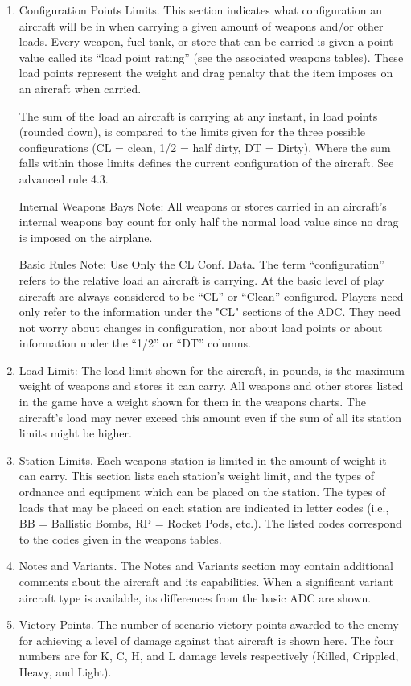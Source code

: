 \begin{enumerate}[resume]
    \item Configuration Points Limits. This section indicates what configuration an aircraft will be in when carrying a given amount of weapons and/or other loads. Every weapon, fuel tank, or store that can be carried is given a point value called its “load point rating” (see the associated weapons tables). These load points represent the weight and drag penalty that the item imposes on an aircraft when carried.

    The sum of the load an aircraft is carrying at any instant, in load points (rounded down), is compared to the limits given for the three possible configurations (CL = clean, 1/2 = half dirty, DT = Dirty). Where the sum falls within those limits defines the current configuration of the aircraft. See advanced rule 4.3.

    Internal Weapons Bays Note:  All weapons or stores carried in an aircraft's internal weapons bay count for only half the normal load value since no drag is imposed on the airplane.

    Basic Rules Note:  Use Only the CL Conf. Data. The term “configuration” refers to the relative load an aircraft is carrying. At the basic level of play aircraft are always considered to be “CL” or “Clean” configured. Players need only refer to the information under the "CL" sections of the ADC. They need not worry about changes in configuration, nor about load points or about information under the “1/2” or “DT” columns.

    \item Load Limit: The load limit shown for the aircraft, in pounds, is the maximum weight of weapons and stores it can carry. All weapons and other stores listed in the game have a weight shown for them in the weapons charts. The aircraft's load may never exceed this amount even if the sum of all its station limits might be higher.

    \item Station Limits. Each weapons station is limited in the amount of weight it can carry. This section lists each station's weight limit, and the types of ordnance and equipment which can be placed on the station. The types of loads that may be placed on each station are indicated in letter codes (i.e., BB = Ballistic Bombs, RP = Rocket Pods, etc.). The listed codes correspond to the codes given in the weapons tables.

    \item Notes and Variants. The Notes and Variants section may contain additional comments about the aircraft and its capabilities. When a significant variant aircraft type is available, its differences from the basic ADC are shown.

    \item Victory Points. The number of scenario victory points awarded to the enemy for achieving a level of damage against that aircraft is shown here. The four numbers are for K, C, H, and L damage levels respectively (Killed, Crippled, Heavy, and Light).

\end{enumerate}

